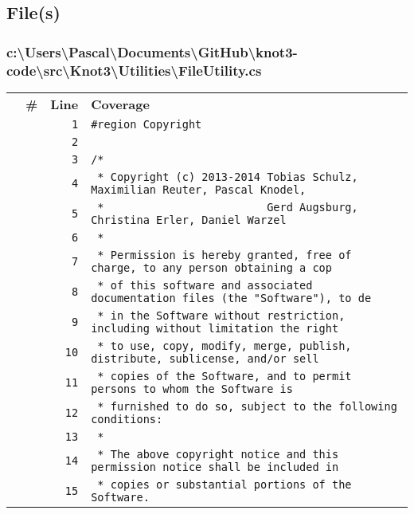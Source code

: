 \documentclass[a4paper,10pt]{article}
\begin{document}
\subsection{File(s)}
\subsubsection{c:\textbackslash Users\textbackslash Pascal\textbackslash Documents\textbackslash GitHub\textbackslash knot3-code\textbackslash src\textbackslash Knot3\textbackslash Utilities\textbackslash FileUtility.cs}
\begin{longtable}[l]{lrrl}
\textbf{} & \textbf{\#} & \textbf{Line} & \textbf{Coverage}\\
\cellcolor{gray} &  & \verb~1~ & \verb~#region Copyright~\\
\cellcolor{gray} &  & \verb~2~ & \verb~~\\
\cellcolor{gray} &  & \verb~3~ & \verb~/*~\\
\cellcolor{gray} &  & \verb~4~ & \verb~ * Copyright (c) 2013-2014 Tobias Schulz, Maximilian Reuter, Pascal Knodel,~\\
\cellcolor{gray} &  & \verb~5~ & \verb~ *                         Gerd Augsburg, Christina Erler, Daniel Warzel~\\
\cellcolor{gray} &  & \verb~6~ & \verb~ *~\\
\cellcolor{gray} &  & \verb~7~ & \verb~ * Permission is hereby granted, free of charge, to any person obtaining a cop~\\
\cellcolor{gray} &  & \verb~8~ & \verb~ * of this software and associated documentation files (the "Software"), to de~\\
\cellcolor{gray} &  & \verb~9~ & \verb~ * in the Software without restriction, including without limitation the right~\\
\cellcolor{gray} &  & \verb~10~ & \verb~ * to use, copy, modify, merge, publish, distribute, sublicense, and/or sell~\\
\cellcolor{gray} &  & \verb~11~ & \verb~ * copies of the Software, and to permit persons to whom the Software is~\\
\cellcolor{gray} &  & \verb~12~ & \verb~ * furnished to do so, subject to the following conditions:~\\
\cellcolor{gray} &  & \verb~13~ & \verb~ *~\\
\cellcolor{gray} &  & \verb~14~ & \verb~ * The above copyright notice and this permission notice shall be included in ~\\
\cellcolor{gray} &  & \verb~15~ & \verb~ * copies or substantial portions of the Software.~\\

\end{longtable}
\end{document}
